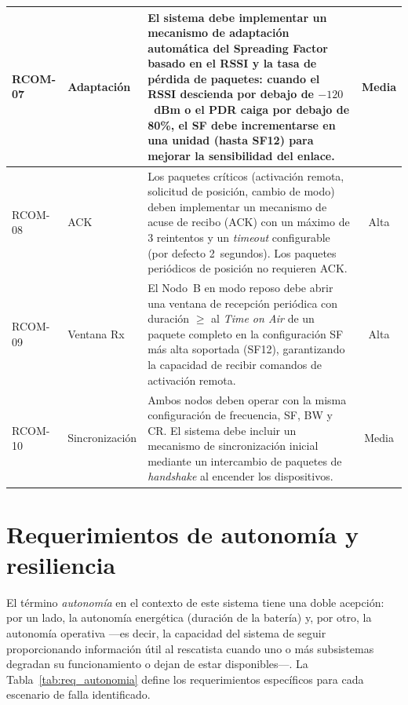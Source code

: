 \begin{table}[H]
\begin{center}
{\begin{tabular}{| l | l | p{8.5cm} | c |}
\hline
RCOM-07 & Adaptación & El sistema debe implementar un mecanismo de adaptación automática del Spreading Factor basado en el RSSI y la tasa de pérdida de paquetes: cuando el RSSI descienda por debajo de $-120$~dBm o el PDR caiga por debajo de 80\%, el SF debe incrementarse en una unidad (hasta SF12) para mejorar la sensibilidad del enlace. & Media \\
\hline
RCOM-08 & ACK & Los paquetes críticos (activación remota, solicitud de posición, cambio de modo) deben implementar un mecanismo de acuse de recibo (ACK) con un máximo de 3 reintentos y un \textit{timeout} configurable (por defecto 2~segundos). Los paquetes periódicos de posición no requieren ACK. & Alta \\
\hline
RCOM-09 & Ventana Rx & El Nodo~B en modo reposo debe abrir una ventana de recepción periódica con duración $\geq$ al \textit{Time on Air} de un paquete completo en la configuración SF más alta soportada (SF12), garantizando la capacidad de recibir comandos de activación remota. & Alta \\
\hline
RCOM-10 & Sincronización & Ambos nodos deben operar con la misma configuración de frecuencia, SF, BW y CR. El sistema debe incluir un mecanismo de sincronización inicial mediante un intercambio de paquetes de \textit{handshake} al encender los dispositivos. & Media \\
\hline

\end{tabular}}
\label{tab:req_comunicacion}
\end{center}
\end{table}


\section{Requerimientos de autonomía y resiliencia}\label{sec:autonomia}

El término \textit{autonomía} en el contexto de este sistema tiene una doble acepción: por un lado, la autonomía energética (duración de la batería) y, por otro, la autonomía operativa ---es decir, la capacidad del sistema de seguir proporcionando información útil al rescatista cuando uno o más subsistemas degradan su funcionamiento o dejan de estar disponibles---. La Tabla~\ref{tab:req_autonomia} define los requerimientos específicos para cada escenario de falla identificado.

